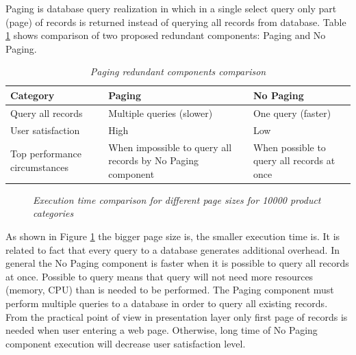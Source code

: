 \documentclass[10pt,a4paper]{article}
\begin{document}
Paging is database query realization in which in a single select query only part (page) of records is returned instead of querying all records from database. Table \ref{pagingcomponents} shows comparison of two proposed redundant components: Paging and No Paging.  
\begin{table}[!htb]
\def\arraystretch{1.5}
\caption{\textit{Paging redundant components comparison}}\label{pagingcomponents}
\begin{tabularx}{\textwidth}{p{3cm}|X|X}
  \textbf{Category} &\textbf{Paging} & \textbf{No Paging} \\
\hline
Query all records & Multiple queries (slower) & One query (faster) \\
User satisfaction & High & Low\\
Top performance circumstances & When impossible to query all records by No Paging component & When possible to query all records at once\\
\end{tabularx}
\end{table}

\begin{figure}[!htb]
\centering
{}

\caption{\textit{Execution time comparison for different page sizes for 10000 product categories}} \label{fig:pagesizetime}

\end{figure}

As shown in Figure \ref{fig:pagesizetime} the bigger page size is, the smaller execution time is. It is related to fact that every query to a database generates additional overhead. 
In general the No Paging component is faster when it is possible to query all records at once. Possible to query means that query will not need more resources (memory, CPU) than is needed to be performed. 
The Paging component must perform multiple queries to a database in order to query all existing records. From the practical point of view in presentation layer only first page of records is needed when user entering a web page. Otherwise, long time of No Paging component execution will decrease user satisfaction level.  
\end{document}
